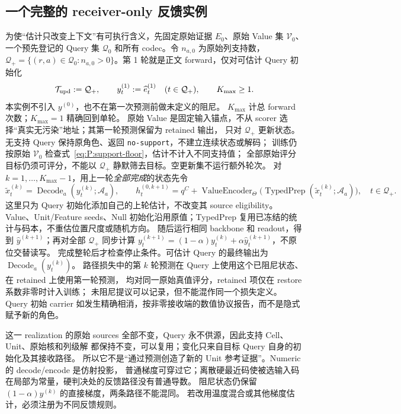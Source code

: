 \documentclass[11pt,UTF8,fontset=fandol]{ctexart}
\numberwithin{equation}{section}
\theoremstyle{definition}
\newcommand{\Vset}{\mathcal V}
\newcommand{\Qset}{\mathcal Q}
\begin{document}
\subsection{一个完整的 receiver-only 反馈实例}
\label{v52:subsec:receiver-feedback}
为使“估计只改变上下文”有可执行含义，先固定原始证据 $E_0$、原始 Value 集 $\Vset_0$、
一个预先登记的 Query 集 $\Qset_0$ 和所有 codec。令 $n_{a,0}$ 为原始列支持数，
$\mathcal Q_+=\{(r,a)\in\Qset_0:n_{a,0}>0\}$。第 1 轮就是正文 forward，仅对可估计 Query 初始化
\begin{equation}
 \mathcal T_{\rm upd}:=\mathcal Q_+,\qquad
 y_t^{(1)}:=\widehat e_t^{(1)}\quad(t\in\mathcal Q_+),\qquad K_{\max}\ge1.
 \label{v53:eq:iteration-initialization}
\end{equation}
本实例不引入 $y^{(0)}$，也不在第一次预测前做未定义的阻尼。
$K_{\max}$ 计总 forward 次数；$K_{\max}=1$ 精确回到单轮。
原始 Value 是固定输入锚点，不从 scorer 选择“真实无污染”地址；其第一轮预测保留为 retained 输出，
只对 $\mathcal Q_+$ 更新状态。无支持 Query 保持原角色、返回 \texttt{no-support}，不建立连续状态或解码；
训练仍按原始 $\Vset_0$ 检查式~\eqref{eq:P:support-floor}，估计不计入不同支持值；
全部原始评分目标仍须可评分，不能以 $\mathcal Q_+$ 静默筛去目标。空更新集不运行额外轮次。
对 $k=1,\ldots,K_{\max}-1$，用上一轮\emph{全部完成}的状态先令
\begin{equation}
 \widetilde x_t^{(k)}=\operatorname{Decode}_a(y_t^{(k)};\mathcal A_a),\qquad
 h_t^{(0,k+1)}=q^C+
 \operatorname{ValueEncoder}_{\Theta}
 \bigl(\operatorname{TypedPrep}(\widetilde x_t^{(k)};\mathcal A_a)\bigr),
 \quad t\in\mathcal Q_+.
 \label{v52:eq:receiver-feedback}
\end{equation}
这里只为 Query 初始化添加自己的上轮估计，不改变其 source eligibility。
Value、Unit/Feature seeds、Null 初始化沿用原值；TypedPrep 复用已冻结的统计与码本，不重估位置尺度或随机方向。
随后运行相同 backbone 和 readout，得到 $\widehat y^{(k+1)}$；再对全部 $\mathcal Q_+$ 同步计算
$y_t^{(k+1)}=(1-\alpha)y_t^{(k)}+\alpha\widehat y_t^{(k+1)}$，不原位交替读写。
完成整轮后才检查停止条件。可估计 Query 的最终输出为 $\operatorname{Decode}_a(y_t^{(k)})$。
路径损失中的第 $k$ 轮预测在 Query 上使用这个已阻尼状态、在 retained 上使用第一轮预测，
均对同一原始真值评分，retained 项仅在 restore 系数非零时计入训练；
未阻尼提议可以记录，但不能混作同一个损失定义。
Query 初始 carrier 如发生精确相消，按非零接收端的数值协议报告，而不是隐式赋予新的角色。

这一 realization 的原始 sources 全部不变，Query 永不供源，因此支持 Cell、Unit、原始核和列级解
都保持不变，可以复用；变化只来自目标 Query 自身的初始化及其接收路径。
所以它不是“通过预测创造了新的 Unit 参考证据”。Numeric 的 decode/encode 是仿射投影，
普通梯度可穿过它；离散硬最近码使被选输入码在局部为常量，硬判决处的反馈路径没有普通导数。
阻尼状态仍保留 $(1-\alpha)y^{(k)}$ 的直接梯度，两条路径不能混同。
若改用温度混合或其他梯度估计，必须注册为不同反馈规则。
\end{document}
